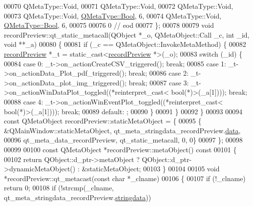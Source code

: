\begin{DoxyCode}
00070     QMetaType::Void,
00071     QMetaType::Void,
00072     QMetaType::Void,
00073     QMetaType::Void, \hyperlink{a00001_a76a8b016e5ad61faf9062cc387df5016}{QMetaType::Bool},    6,
00074     QMetaType::Void, \hyperlink{a00001_a76a8b016e5ad61faf9062cc387df5016}{QMetaType::Bool},    6,
00075 
00076        0        \textcolor{comment}{// eod}
00077 \};
00078 
00079 \textcolor{keywordtype}{void} recordPreview::qt\_static\_metacall(QObject *\_o, QMetaObject::Call \_c, \textcolor{keywordtype}{int} \_id, \textcolor{keywordtype}{void} **\_a)
00080 \{
00081     \textcolor{keywordflow}{if} (\_c == QMetaObject::InvokeMetaMethod) \{
00082         \hyperlink{a00020}{recordPreview} *\_t = \textcolor{keyword}{static\_cast<}\hyperlink{a00020}{recordPreview} *\textcolor{keyword}{>}(\_o);
00083         \textcolor{keywordflow}{switch} (\_id) \{
00084         \textcolor{keywordflow}{case} 0: \_t->on\_actionCreateCSV\_triggered(); \textcolor{keywordflow}{break};
00085         \textcolor{keywordflow}{case} 1: \_t->on\_actionData\_Plot\_pdf\_triggered(); \textcolor{keywordflow}{break};
00086         \textcolor{keywordflow}{case} 2: \_t->on\_actionData\_plot\_img\_triggered(); \textcolor{keywordflow}{break};
00087         \textcolor{keywordflow}{case} 3: \_t->on\_actionWinDataPlot\_toggled((*\textcolor{keyword}{reinterpret\_cast<} \textcolor{keywordtype}{bool}(*)\textcolor{keyword}{>}(\_a[1]))); \textcolor{keywordflow}{break};
00088         \textcolor{keywordflow}{case} 4: \_t->on\_actionWinEventPlot\_toggled((*\textcolor{keyword}{reinterpret\_cast<} \textcolor{keywordtype}{bool}(*)\textcolor{keyword}{>}(\_a[1]))); \textcolor{keywordflow}{break};
00089         \textcolor{keywordflow}{default}: ;
00090         \}
00091     \}
00092 \}
00093 
00094 \textcolor{keyword}{const} QMetaObject recordPreview::staticMetaObject = \{
00095     \{ &QMainWindow::staticMetaObject, qt\_meta\_stringdata\_recordPreview.\hyperlink{a00017_a61be725f4f67b385a56830793423ff45}{data},
00096       qt\_meta\_data\_recordPreview,  qt\_static\_metacall, 0, 0\}
00097 \};
00098 
00099 
00100 \textcolor{keyword}{const} QMetaObject *recordPreview::metaObject()\textcolor{keyword}{ const}
00101 \textcolor{keyword}{}\{
00102     \textcolor{keywordflow}{return} QObject::d\_ptr->metaObject ? QObject::d\_ptr->dynamicMetaObject() : &staticMetaObject;
00103 \}
00104 
00105 \textcolor{keywordtype}{void} *recordPreview::qt\_metacast(\textcolor{keyword}{const} \textcolor{keywordtype}{char} *\_clname)
00106 \{
00107     \textcolor{keywordflow}{if} (!\_clname) \textcolor{keywordflow}{return} 0;
00108     \textcolor{keywordflow}{if} (!strcmp(\_clname, qt\_meta\_stringdata\_recordPreview.\hyperlink{a00017_af0762b30c491f46fa9caf80c9ae5f6ca}{stringdata}))

\end{DoxyCode}

